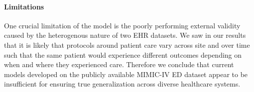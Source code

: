 \documentclass{article}
\theoremstyle{plain}
\theoremstyle{definition}
\theoremstyle{remark}
\begin{document}
{%




\paragraph{Limitations}

One crucial limitation of the model is the poorly performing external validity caused by the heterogenous nature of two EHR datasets. 
We saw in our results that it is likely that protocols around patient care vary across site and over time such that the same patient would experience different outcomes depending on when and where they experienced care. Therefore we conclude that current models developed on the publicly available MIMIC-IV ED dataset appear to be insufficient for ensuring true generalization across diverse healthcare systems.

}
\end{document}
